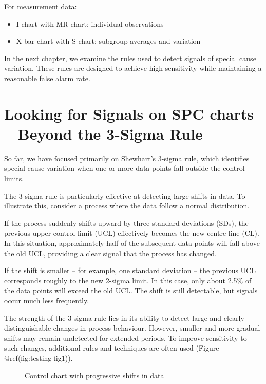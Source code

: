 \documentclass[
]{book}
\makeatletter
\newcommand*\pandocbounded[1]{%
  \sbox\pandoc@box{#1}%
  \Gscale@div\@tempa{\textheight}{\dimexpr\ht\pandoc@box+\dp\pandoc@box\relax}%
  \Gscale@div\@tempb{\linewidth}{\wd\pandoc@box}%
  \ifdim\@tempb\p@<\@tempa\p@\let\@tempa\@tempb\fi%
  \ifdim\@tempa\p@<\p@\scalebox{\@tempa}{\usebox\pandoc@box}%
  \else\usebox{\pandoc@box}%
  \fi%
}
\providecommand{\tightlist}{%
  \setlength{\itemsep}{0pt}\setlength{\parskip}{0pt}}
\makeatother
\begin{document}
For measurement data:

\begin{itemize}
\tightlist
\item
  I chart with MR chart: individual observations
\item
  X-bar chart with S chart: subgroup averages and variation
\end{itemize}

In the next chapter, we examine the rules used to detect signals of
special cause variation. These rules are designed to achieve high
sensitivity while maintaining a reasonable false alarm rate.

\chapter{Looking for Signals on SPC charts -- Beyond the 3-Sigma
Rule}\label{testing}

So far, we have focused primarily on Shewhart's 3-sigma rule, which
identifies special cause variation when one or more data points fall
outside the control limits.

The 3-sigma rule is particularly effective at detecting large shifts in
data. To illustrate this, consider a process where the data follow a
normal distribution.

If the process suddenly shifts upward by three standard deviations
(SDs), the previous upper control limit (UCL) effectively becomes the
new centre line (CL). In this situation, approximately half of the
subsequent data points will fall above the old UCL, providing a clear
signal that the process has changed.

If the shift is smaller -- for example, one standard deviation -- the
previous UCL corresponds roughly to the new 2-sigma limit. In this case,
only about 2.5\% of the data points will exceed the old UCL. The shift
is still detectable, but signals occur much less frequently.

The strength of the 3-sigma rule lies in its ability to detect large and
clearly distinguishable changes in process behaviour. However, smaller
and more gradual shifts may remain undetected for extended periods. To
improve sensitivity to such changes, additional rules and techniques are
often used (Figure @ref(fig:testing-fig1)).

\begin{figure}
\centering
\pandocbounded{}
\caption{Control chart with progressive shifts in data}
\end{figure}
\end{document}
